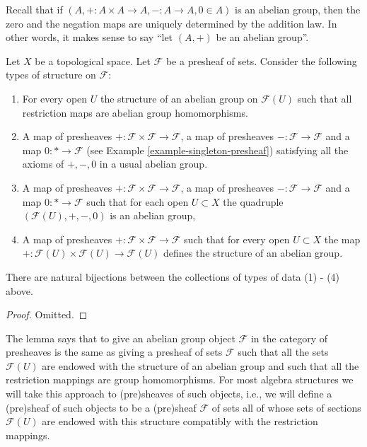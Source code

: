 \noindent
Recall that if $(A, + : A \times A \to A, - : A \to A, 0\in A)$
is an abelian group, then the zero and the negation maps are
uniquely determined by the addition law. In other words, it
makes sense to say ``let $(A, +)$ be an abelian group''.

\begin{lemma}
\label{lemma-abelian-presheaves}
Let $X$ be a topological space.
Let $\mathcal{F}$ be a presheaf of sets.
Consider the following types of structure on $\mathcal{F}$:
\begin{enumerate}
\item For every open $U$ the structure of an abelian group
on $\mathcal{F}(U)$ such that all restriction maps are
abelian group homomorphisms.
\item A map of presheaves
$+ : \mathcal{F} \times \mathcal{F} \to \mathcal{F}$,
a map of presheaves $- : \mathcal{F} \to \mathcal{F}$
and a map $0 : * \to \mathcal{F}$
(see Example \ref{example-singleton-presheaf})
satisfying all the axioms of $+, -, 0$ in a usual
abelian group.
\item A map of presheaves
$+ : \mathcal{F} \times \mathcal{F} \to \mathcal{F}$,
a map of presheaves $- : \mathcal{F} \to \mathcal{F}$
and a map $0 : * \to \mathcal{F}$
such that for each open $U \subset X$ the quadruple
$(\mathcal{F}(U), +, -, 0)$ is an abelian group,
\item A map of presheaves $+ : \mathcal{F} \times \mathcal{F}
\to \mathcal{F}$ such that for every open $U \subset X$
the map $+ : \mathcal{F}(U) \times \mathcal{F}(U) \to \mathcal{F}(U)$
defines the structure of an abelian group.
\end{enumerate}
There are natural bijections between the collections of
types of data (1) - (4) above.
\end{lemma}

\begin{proof}
Omitted.
\end{proof}

\noindent
The lemma says that to give an abelian group object $\mathcal{F}$
in the category of presheaves is the same as giving a presheaf of sets
$\mathcal{F}$ such that all the sets $\mathcal{F}(U)$ are endowed
with the structure of an abelian group and such that all the restriction
mappings are group homomorphisms. For most algebra structures
we will take this approach to (pre)sheaves of such objects, i.e.,
we will define a (pre)sheaf of such objects to be a (pre)sheaf
$\mathcal{F}$ of sets all of whose sets of sections $\mathcal{F}(U)$
are endowed with this structure compatibly with the restriction
mappings.

